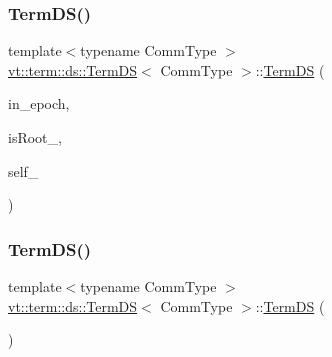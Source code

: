 \subsubsection{\texorpdfstring{Term\+D\+S()}{TermDS()}\hspace{0.1cm}{\footnotesize\ttfamily [1/3]}}
{\footnotesize\ttfamily template$<$typename Comm\+Type $>$ \\
\hyperlink{structvt_1_1term_1_1ds_1_1_term_d_s}{vt\+::term\+::ds\+::\+Term\+DS}$<$ Comm\+Type $>$\+::\hyperlink{structvt_1_1term_1_1ds_1_1_term_d_s}{Term\+DS} (\begin{DoxyParamCaption}\item[{\hyperlink{namespacevt_a985a5adf291c34a3ca263b3378388236}{Epoch\+Type}}]{in\+\_\+epoch,  }\item[{bool}]{is\+Root\+\_\+,  }\item[{\hyperlink{namespacevt_a866da9d0efc19c0a1ce79e9e492f47e2}{Node\+Type}}]{self\+\_\+ }\end{DoxyParamCaption})}

\mbox{\label{structvt_1_1term_1_1ds_1_1_term_d_s_a01ffd2a7fc4410599708c3fcb5998743}} 
\subsubsection{\texorpdfstring{Term\+D\+S()}{TermDS()}\hspace{0.1cm}{\footnotesize\ttfamily [2/3]}}
{\footnotesize\ttfamily template$<$typename Comm\+Type $>$ \\
\hyperlink{structvt_1_1term_1_1ds_1_1_term_d_s}{vt\+::term\+::ds\+::\+Term\+DS}$<$ Comm\+Type $>$\+::\hyperlink{structvt_1_1term_1_1ds_1_1_term_d_s}{Term\+DS} (\begin{DoxyParamCaption}\item[{\hyperlink{structvt_1_1term_1_1ds_1_1_term_d_s}{Term\+DS}$<$ Comm\+Type $>$ \&\&}]{ }\end{DoxyParamCaption})\hspace{0.3cm}{\ttfamily [default]}}

\mbox{\label{structvt_1_1term_1_1ds_1_1_term_d_s_a513d27464e9c231a24a755bf80a93dcd}} 
